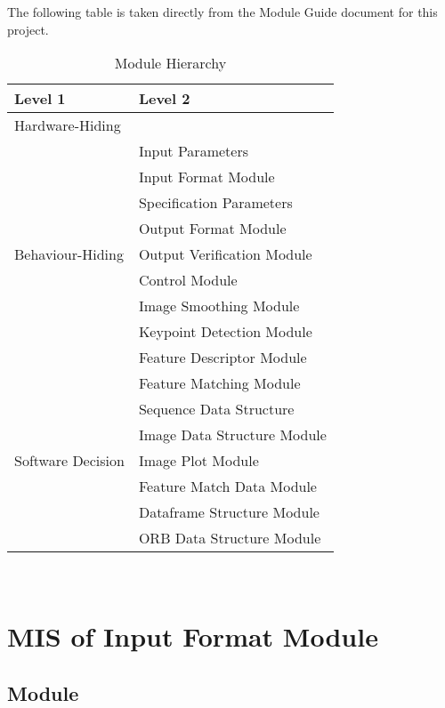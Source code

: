\documentclass[12pt, titlepage]{article}
\begin{document}
The following table is taken directly from the Module Guide document for this project.

\begin{table}[h!]
\centering
\begin{tabular}{p{} p{}}
\toprule
\textbf{Level 1} & \textbf{Level 2}\\
\midrule

{Hardware-Hiding} & ~ \\
\midrule

\multirow{9}{0.3\textwidth}{Behaviour-Hiding} & Input Parameters\\
& Input Format Module \\
& Specification Parameters \\
& Output Format Module \\
& Output Verification Module \\
& Control Module \\
& Image Smoothing Module \\
& Keypoint Detection Module \\
& Feature Descriptor Module \\
& Feature Matching Module \\
\midrule

\multirow{5}{0.3\textwidth}{Software Decision} & {Sequence Data Structure}\\
& Image Data Structure Module \\
& Image Plot Module \\
& Feature Match Data Module \\
& Dataframe Structure Module \\
& ORB Data Structure Module \\
\bottomrule
 
\end{tabular}
\caption{Module Hierarchy}
\label{TblMH}
\end{table}

\newpage
~\newpage

\section{MIS of Input Format Module} \label{mIF}



\subsection{Module}
\end{document}

